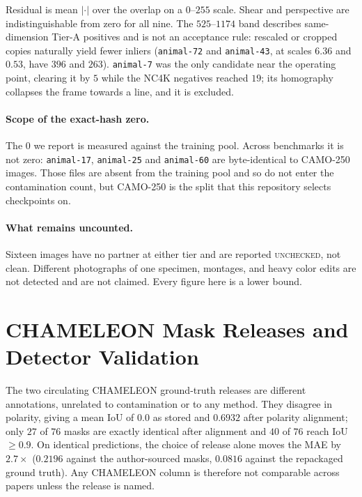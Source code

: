 \documentclass{article}
\begin{document}
Residual is mean $|{\cdot}|$ over the overlap on a $0$--$255$ scale. Shear and perspective are
indistinguishable from zero for all nine. The $525$--$1174$ band describes same-dimension Tier-A
positives and is not an acceptance rule: rescaled or cropped copies naturally yield fewer inliers
(\texttt{animal-72} and \texttt{animal-43}, at scales $6.36$ and $0.53$, have $396$ and $263$).
\texttt{animal-7} was the only candidate near the operating point, clearing it by $5$ while the NC4K
negatives reached $19$; its homography collapses the frame towards a line, and it is excluded.

\paragraph{Scope of the exact-hash zero.} The $0$ we report is measured against the training pool.
Across benchmarks it is not zero: \texttt{animal-17}, \texttt{animal-25} and \texttt{animal-60} are
byte-identical to CAMO-250 images. Those files are absent from the training pool and so do not enter
the contamination count, but CAMO-250 is the split that this repository selects checkpoints on.

\paragraph{What remains uncounted.} Sixteen images have no partner at either tier and are reported
\textsc{unchecked}, not clean. Different photographs of one specimen, montages, and heavy color edits
are not detected and are not claimed. Every figure here is a lower bound.


\section{CHAMELEON Mask Releases and Detector Validation}
\label{app:masks}

The two circulating CHAMELEON ground-truth releases are different annotations, unrelated to
contamination or to any method. They disagree in polarity, giving a mean IoU of $0.0$ as stored and
$0.6932$ after polarity alignment; only $27$ of $76$ masks are exactly identical after alignment and
$40$ of $76$ reach IoU $\geq 0.9$. On identical predictions, the choice of release alone moves the MAE by
$2.7\times$ ($0.2196$ against the author-sourced masks, $0.0816$ against the repackaged ground truth).
Any CHAMELEON column is therefore not comparable across papers unless the release is named.
\end{document}
